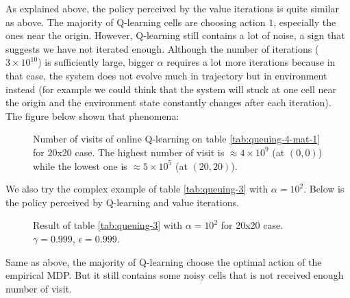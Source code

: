 \documentclass[
  a4paper, xcolor = usenames,dvipsnames]{article}
\theoremstyle{definition}
\theoremstyle{definition}
\theoremstyle{definition}
\theoremstyle{definition}
\theoremstyle{remark}
\begin{document}
As explained above, the policy perceived by the value iterations is quite similar as above. The majority of Q-learning cells are choosing action \(1\), especially the ones near the origin. However, Q-learning still contains a lot of noise, a sign that suggests we have not iterated enough. Although the number of iterations (\(3 \times 10^{10}\)) is sufficiently large, bigger \(\alpha\) requires a lot more iterations because in that case, the system does not evolve much in trajectory but in environment instead (for example we could think that the system will stuck at one cell near the origin and the environment state constantly changes after each iteration). The figure below shown that phenomena:



\begin{figure}

{\centering {}

}

\caption{Number of visits of online Q-learning on table \ref{tab:queuing-4-mat-1} for 20x20 case. The highest number of visit is \(\approx 4 \times 10^{9}\) (at \((0, 0)\)) while the lowest one is \(\approx 5 \times 10^5\) (at \((20, 20)\)).}\label{fig:20x20-queuing-4-n-visit}
\end{figure}

We also try the complex example of table \ref{tab:queuing-3} with \(\alpha = 10^{2}\). Below is the policy perceived by Q-learning and value iterations.



\begin{figure}

{\centering {}

}

\caption{Result of table \ref{tab:queuing-3} with \(\alpha = 10^{2}\) for 20x20 case. \(\gamma = 0.999\), \(\epsilon = 0.999\).}\label{fig:20x20-queuing-5}
\end{figure}

Same as above, the majority of Q-learning choose the optimal action of the empirical MDP. But it still contains some noisy cells that is not received enough number of visit.

\newpage

\printbibliography
\end{document}
